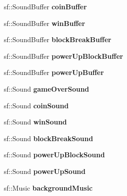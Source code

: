 \begin{DoxyCompactItemize}
\item 
\hypertarget{class_game_play_a82e90b0bfce0443471b54943a11f254d}{sf\-::\-Sound\-Buffer {\bfseries coin\-Buffer}}\label{class_game_play_a82e90b0bfce0443471b54943a11f254d}

\item 
\hypertarget{class_game_play_a086bd4e522cc7f107aa8729da37f0d0f}{sf\-::\-Sound\-Buffer {\bfseries win\-Buffer}}\label{class_game_play_a086bd4e522cc7f107aa8729da37f0d0f}

\item 
\hypertarget{class_game_play_a15bb2d831db86a7cb66fd89568971b63}{sf\-::\-Sound\-Buffer {\bfseries block\-Break\-Buffer}}\label{class_game_play_a15bb2d831db86a7cb66fd89568971b63}

\item 
\hypertarget{class_game_play_ab58ca928fcddef9ce2739ea5b68f074d}{sf\-::\-Sound\-Buffer {\bfseries power\-Up\-Block\-Buffer}}\label{class_game_play_ab58ca928fcddef9ce2739ea5b68f074d}

\item 
\hypertarget{class_game_play_a0954ad834629cf6acb1235562c0e8d79}{sf\-::\-Sound\-Buffer {\bfseries power\-Up\-Buffer}}\label{class_game_play_a0954ad834629cf6acb1235562c0e8d79}

\item 
\hypertarget{class_game_play_a8dad752106ccef7498c8cdec564c3640}{sf\-::\-Sound {\bfseries game\-Over\-Sound}}\label{class_game_play_a8dad752106ccef7498c8cdec564c3640}

\item 
\hypertarget{class_game_play_aff2e8ec6a84bde0974943682715e2ce0}{sf\-::\-Sound {\bfseries coin\-Sound}}\label{class_game_play_aff2e8ec6a84bde0974943682715e2ce0}

\item 
\hypertarget{class_game_play_aca7e389685b4fe52cacd43da0c5f6188}{sf\-::\-Sound {\bfseries win\-Sound}}\label{class_game_play_aca7e389685b4fe52cacd43da0c5f6188}

\item 
\hypertarget{class_game_play_a1c2c6762b82ae0a369403a9902404529}{sf\-::\-Sound {\bfseries block\-Break\-Sound}}\label{class_game_play_a1c2c6762b82ae0a369403a9902404529}

\item 
\hypertarget{class_game_play_a7967804865ed893966d7cda335f255bf}{sf\-::\-Sound {\bfseries power\-Up\-Block\-Sound}}\label{class_game_play_a7967804865ed893966d7cda335f255bf}

\item 
\hypertarget{class_game_play_afd382f7d108792a43e5223e43e498653}{sf\-::\-Sound {\bfseries power\-Up\-Sound}}\label{class_game_play_afd382f7d108792a43e5223e43e498653}

\item 
\hypertarget{class_game_play_a26196da953ca24d8bbd0a669c99777b4}{sf\-::\-Music {\bfseries background\-Music}}\label{class_game_play_a26196da953ca24d8bbd0a669c99777b4}

\end{DoxyCompactItemize}


